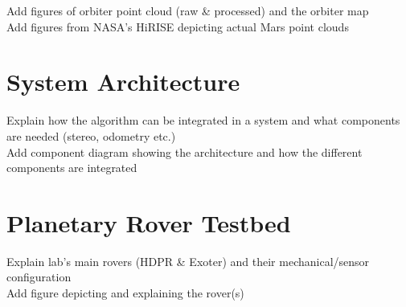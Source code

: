 \noindent
Add figures of orbiter point cloud (raw \& processed) and the orbiter map\\
Add figures from NASA's HiRISE depicting actual Mars point clouds

\section{System Architecture}

Explain how the algorithm can be integrated in a system and what components are needed (stereo, odometry etc.)\\
Add component diagram showing the architecture and how the different components are integrated\\

\section{Planetary Rover Testbed}

Explain lab's main rovers (HDPR \& Exoter) and their mechanical/sensor configuration\\
Add figure depicting and explaining the rover(s)

